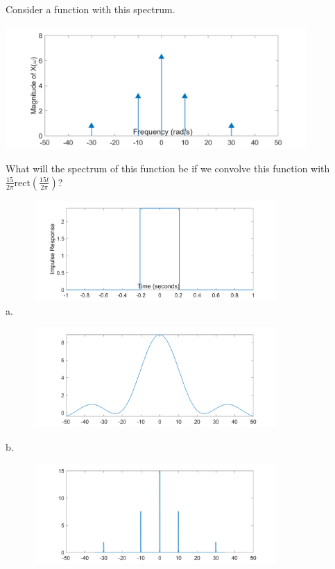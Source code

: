 
Consider a function with this spectrum.

\includegraphics[width=4.52749in,height=1.84565in]{../../Images/FrequencyDomainQ2Spectr.png}

What will the spectrum of this function be if we convolve this function with \(\frac{15}{2\pi}\text{rect}\left( \frac{15t}{2\pi} \right)\)?

\includegraphics[width=4.5in,height=1.5in]{../../Images/FrequencyDomainQ2Conv.png}\\

a. 

\includegraphics[width=4.5in,height=1.5in]{../../Images/FrequencyDomainQ2a.png}

b. 

\includegraphics[width=4.5in,height=1.5in]{../../Images/FrequencyDomainQ2b.png}

